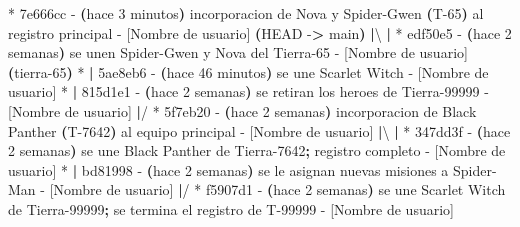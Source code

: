 \documentclass[
]{book}
\newenvironment{Shaded}{\begin{snugshade}}{\end{snugshade}}
\newcommand{\AttributeTok}[1]{\textcolor[rgb]{0.13,0.29,0.53}{#1}}
\newcommand{\ErrorTok}[1]{\textcolor[rgb]{0.64,0.00,0.00}{\textbf{#1}}}
\newcommand{\ExtensionTok}[1]{#1}
\newcommand{\KeywordTok}[1]{\textcolor[rgb]{0.13,0.29,0.53}{\textbf{#1}}}
\newcommand{\NormalTok}[1]{#1}
\newcommand{\OperatorTok}[1]{\textcolor[rgb]{0.81,0.36,0.00}{\textbf{#1}}}
\begin{document}
\begin{Shaded}
\begin{Highlighting}[]
\ExtensionTok{*}\NormalTok{   7e666cc }\AttributeTok{{-}} \ErrorTok{(}\ExtensionTok{hace}\NormalTok{ 3 minutos}\KeywordTok{)} \ExtensionTok{incorporacion}\NormalTok{ de Nova y Spider{-}Gwen }\ErrorTok{(}\ExtensionTok{T{-}65}\KeywordTok{)} \ExtensionTok{al}\NormalTok{ registro principal }\AttributeTok{{-}}\NormalTok{ [Nombre de usuario] }\ErrorTok{(}\ExtensionTok{HEAD} \AttributeTok{{-}}\OperatorTok{\textgreater{}}\NormalTok{ main}\KeywordTok{)}
\KeywordTok{|}\ExtensionTok{\textbackslash{} } 
\KeywordTok{|} \ExtensionTok{*}\NormalTok{ edf50e5 }\AttributeTok{{-}} \ErrorTok{(}\ExtensionTok{hace}\NormalTok{ 2 semanas}\KeywordTok{)} \ExtensionTok{se}\NormalTok{ unen Spider{-}Gwen y Nova del Tierra{-}65 }\AttributeTok{{-}}\NormalTok{ [Nombre de usuario] }\ErrorTok{(}\ExtensionTok{tierra{-}65}\KeywordTok{)}
\ExtensionTok{*} \KeywordTok{|} \ExtensionTok{5ae8eb6} \AttributeTok{{-}} \ErrorTok{(}\ExtensionTok{hace}\NormalTok{ 46 minutos}\KeywordTok{)} \ExtensionTok{se}\NormalTok{ une Scarlet Witch }\AttributeTok{{-}}\NormalTok{ [Nombre de usuario]}
\ExtensionTok{*} \KeywordTok{|} \ExtensionTok{815d1e1} \AttributeTok{{-}} \ErrorTok{(}\ExtensionTok{hace}\NormalTok{ 2 semanas}\KeywordTok{)} \ExtensionTok{se}\NormalTok{ retiran los heroes de Tierra{-}99999 }\AttributeTok{{-}}\NormalTok{ [Nombre de usuario]}
\KeywordTok{|}\ExtensionTok{/}  
\ExtensionTok{*}\NormalTok{   5f7eb20 }\AttributeTok{{-}} \ErrorTok{(}\ExtensionTok{hace}\NormalTok{ 2 semanas}\KeywordTok{)} \ExtensionTok{incorporacion}\NormalTok{ de Black Panther }\ErrorTok{(}\ExtensionTok{T{-}7642}\KeywordTok{)} \ExtensionTok{al}\NormalTok{ equipo principal }\AttributeTok{{-}}\NormalTok{ [Nombre de usuario]}
\KeywordTok{|}\ExtensionTok{\textbackslash{} } 
\KeywordTok{|} \ExtensionTok{*}\NormalTok{ 347dd3f }\AttributeTok{{-}} \ErrorTok{(}\ExtensionTok{hace}\NormalTok{ 2 semanas}\KeywordTok{)} \ExtensionTok{se}\NormalTok{ une Black Panther de Tierra{-}7642}\KeywordTok{;} \ExtensionTok{registro}\NormalTok{ completo }\AttributeTok{{-}}\NormalTok{ [Nombre de usuario]}
\ExtensionTok{*} \KeywordTok{|} \ExtensionTok{bd81998} \AttributeTok{{-}} \ErrorTok{(}\ExtensionTok{hace}\NormalTok{ 2 semanas}\KeywordTok{)} \ExtensionTok{se}\NormalTok{ le asignan nuevas misiones a Spider{-}Man }\AttributeTok{{-}}\NormalTok{ [Nombre de usuario]}
\KeywordTok{|}\ExtensionTok{/}  
\ExtensionTok{*}\NormalTok{ f5907d1 }\AttributeTok{{-}} \ErrorTok{(}\ExtensionTok{hace}\NormalTok{ 2 semanas}\KeywordTok{)} \ExtensionTok{se}\NormalTok{ une Scarlet Witch de Tierra{-}99999}\KeywordTok{;} \ExtensionTok{se}\NormalTok{ termina el registro de T{-}99999 }\AttributeTok{{-}}\NormalTok{ [Nombre de usuario]}

\end{Highlighting}
\end{Shaded}
\end{document}
